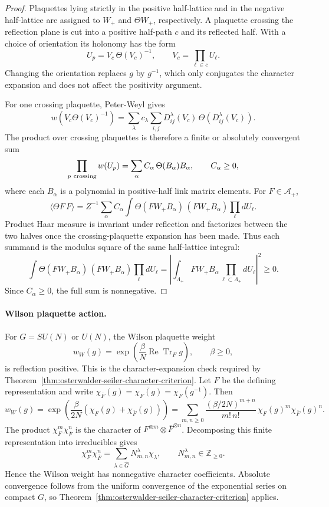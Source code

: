 \begin{proof}
Plaquettes lying strictly in the positive half-lattice and in the negative
half-lattice are assigned to \(W_+\) and \(\Theta W_+\), respectively.  A
plaquette crossing the reflection plane is cut into a positive half-path
\(c\) and its reflected half.  With a choice of orientation its holonomy has
the form
\[
  U_p=V_c\,\Theta(V_c)^{-1},
  \qquad
  V_c=\prod_{\ell\in c}U_\ell .
\]
Changing the orientation replaces \(g\) by \(g^{-1}\), which only conjugates
the character expansion and does not affect the positivity argument.

For one crossing plaquette, Peter-Weyl gives
\[
  w\!\left(V_c\Theta(V_c)^{-1}\right)
  =
  \sum_{\lambda}c_\lambda
  \sum_{i,j}
  D^\lambda_{ij}(V_c)\,
  \Theta\!\left(D^\lambda_{ij}(V_c)\right).
\]
The product over crossing plaquettes is therefore a finite or absolutely
convergent sum
\[
  \prod_{p\ {\rm crossing}}w(U_p)
  =
  \sum_\alpha C_\alpha\,\Theta(B_\alpha)B_\alpha,
  \qquad C_\alpha\geq0,
\]
where each \(B_\alpha\) is a polynomial in positive-half link matrix
elements.  For \(F\in\mathcal A_+\),
\[
  \langle \Theta F\,F\rangle
  =
  Z^{-1}\sum_\alpha C_\alpha
  \int
  \Theta(FW_+B_\alpha)\,(FW_+B_\alpha)
  \prod_{\ell}dU_\ell .
\]
Product Haar measure is invariant under reflection and factorizes between
the two halves once the crossing-plaquette expansion has been made.  Thus
each summand is the modulus square of the same half-lattice integral:
\[
  \int
  \Theta(FW_+B_\alpha)\,(FW_+B_\alpha)
  \prod_{\ell}dU_\ell
  =
  \left|
  \int_{\Lambda_+}FW_+B_\alpha\prod_{\ell\subset\Lambda_+}dU_\ell
  \right|^2
  \geq0 .
\]
Since \(C_\alpha\geq0\), the full sum is nonnegative.
\end{proof}

\paragraph{Wilson plaquette action.}
For \(G=SU(N)\) or \(U(N)\), the Wilson plaquette weight
\[
  w_W(g)
  =
  \exp\!\left(\frac{\beta}{N}\operatorname{Re}\operatorname{Tr}_F g\right),
  \qquad \beta\geq0,
\]
is reflection positive.
This is the character-expansion check required by
Theorem~\ref{thm:osterwalder-seiler-character-criterion}.  Let \(F\) be the
defining representation and write
\(\chi_{\overline F}(g)=\overline{\chi_F(g)}=\chi_F(g^{-1})\).  Then
\[
  w_W(g)
  =
  \exp\!\left(\frac{\beta}{2N}
  \left(\chi_F(g)+\chi_{\overline F}(g)\right)\right)
  =
  \sum_{m,n\geq0}
  \frac{(\beta/2N)^{m+n}}{m!\,n!}\,
  \chi_F(g)^m\chi_{\overline F}(g)^n .
\]
The product \(\chi_F^m\chi_{\overline F}^n\) is the character of
\(F^{\otimes m}\otimes\overline F^{\otimes n}\).  Decomposing this finite
representation into irreducibles gives
\[
  \chi_F^m\chi_{\overline F}^n
  =
  \sum_{\lambda\in\widehat G}
  N^\lambda_{m,n}\chi_\lambda,
  \qquad
  N^\lambda_{m,n}\in\mathbb Z_{\geq0}.
\]
Hence the Wilson weight has nonnegative character coefficients.  Absolute
convergence follows from the uniform convergence of the exponential series
on compact \(G\), so Theorem~\ref{thm:osterwalder-seiler-character-criterion}
applies.

